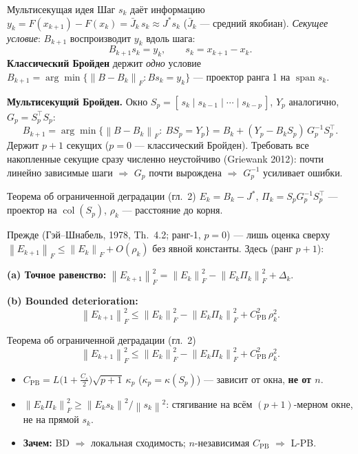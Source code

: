 \documentclass[aspectratio=169,11pt,t]{beamer}
\newcommand{\Fn}[1]{\left\|#1\right\|_F}
\newcommand{\nrm}[1]{\left\|#1\right\|}
\DeclareMathOperator{\col}{col}
\DeclareMathOperator{\spn}{span}
\begin{document}
\begin{frame}{Мультисекущая идея}
Шаг \(s_k\) даёт информацию \(y_k=F(x_{k+1})-F(x_k)=\bar J_k\,s_k\approx J^*s_k\)
(\(\bar J_k\) — средний якобиан). \emph{Секущее условие}: \(B_{k+1}\) воспроизводит \(y_k\) вдоль шага:
\[ B_{k+1}s_k=y_k,\qquad s_k=x_{k+1}-x_k. \]
\textbf{Классический Бройден} держит \emph{одно} условие
\(B_{k+1}=\arg\min\{\Fn{B-B_k}:Bs_k=y_k\}\) — проектор ранга 1 на \(\spn s_k\).

\textbf{Мультисекущий Бройден.} Окно \(S_p=[\,s_k\mid s_{k-1}\mid\cdots\mid s_{k-p}\,]\),
\(Y_p\) аналогично, \(G_p=S_p^\top S_p\):
\[ B_{k+1}=\arg\min\{\Fn{B-B_k}:\ B S_p=Y_p\}
        =B_k+(Y_p-B_kS_p)\,G_p^{-1}S_p^\top. \]
Держит \(p{+}1\) секущих (\(p=0\) — классический Бройден).
\smallskip
{\scriptsize Требовать все накопленные секущие сразу численно неустойчиво (Griewank 2012): почти линейно зависимые шаги \(\Rightarrow\) \(G_p\) почти
вырождена \(\Rightarrow\) \(G_p^{-1}\) усиливает ошибки.}
\end{frame}

\begin{frame}{Теорема об ограниченной деградации (гл.~2)}
\(E_k=B_k-J^*\), \(\Pi_k=S_pG_p^{-1}S_p^\top\) — проектор на \(\col(S_p)\),
\(\rho_k\) — расстояние до корня.
\smallskip

{\small Прежде (Гэй–Шнабель, 1978, Th.~4.2; ранг-1, \(p=0\)) — лишь оценка сверху
\(\Fn{E_{k+1}}\le\Fn{E_k}+O(\rho_k)\) без явной константы. Здесь (ранг \(p{+}1\)):}

\medskip
\textbf{(a) Точное равенство:}\quad
\(\Fn{E_{k+1}}^2=\Fn{E_k}^2-\Fn{E_k\Pi_k}^2+\Delta_k.\)

\medskip
\textbf{(b) Bounded deterioration:}
\[ \Fn{E_{k+1}}^2\le\Fn{E_k}^2-\Fn{E_k\Pi_k}^2+C_{\mathrm{PB}}^2\,\rho_k^2. \]
\end{frame}

\begin{frame}{Теорема об ограниченной деградации (гл.~2)}
\[ \Fn{E_{k+1}}^2\le\Fn{E_k}^2-\Fn{E_k\Pi_k}^2+C_{\mathrm{PB}}^2\,\rho_k^2. \]
\begin{itemize}\setlength{\itemsep}{8pt}
  \item \(C_{\mathrm{PB}}=L\big(1+\tfrac{C_s}{2}\big)\sqrt{p+1}\,\kappa_p\)
        (\(\kappa_p=\kappa(S_p)\)) — зависит от окна, \textbf{не от \(n\)}.
  \item \(\Fn{E_k\Pi_k}^2\ge\nrm{E_ks_k}^2/\nrm{s_k}^2\): стягивание на всём
        \((p{+}1)\)-мерном окне, не на прямой \(s_k\).
  \item \textbf{Зачем:} BD \(\Rightarrow\) локальная сходимость;
        \(n\)-независимая \(C_{\mathrm{PB}}\) \(\Rightarrow\) L-PB.
\end{itemize}
\end{frame}
\end{document}

